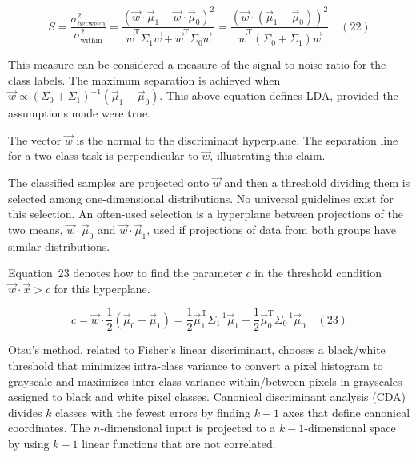 \documentclass[preprint,12pt]{elsarticle}
\begin{document}
\begin{equation}
	S={\frac{\sigma_{\text{between}}^{2}}{\sigma_{\text{within}}^{2}}}={\frac{({\vec{w}}\cdot{\vec{\mu}}_{1}-{\vec{w}}\cdot {\vec{\mu}}_{0})^{2}}{{\vec{w}}^{\mathrm{T}}\Sigma_{1}{\vec{w}}+{\vec{w}}^{\mathrm{T}}\Sigma_{0}{\vec{w}}}}={\frac{({\vec{w}}\cdot ({\vec{\mu}}_{1}-{\vec{\mu}}_{0}))^{2}}{{\vec{w}}^{\mathrm{T}}(\Sigma_{0}+\Sigma_{1}){\vec{w}}}}
	\quad\left(22\right)
\end{equation}

This measure can be considered a measure of the signal-to-noise ratio for the class labels. The maximum separation is achieved when ${\vec{w}}\propto\left(\Sigma_{0}+\Sigma_{1}\right)^{-1}\left({\vec{\mu}}_{1}-{\vec{\mu}}_{0}\right)$. This above equation defines LDA, provided the assumptions made were true.

The vector  $\vec{w}$ is the normal to the discriminant hyperplane. The separation line for a two-class task is perpendicular to $\vec{w}$, illustrating this claim.

The classified samples are projected onto $\vec{w}$ and then a threshold dividing them is selected among one-dimensional distributions. No universal guidelines exist for this selection. An often-used selection is a hyperplane between projections of the two means, ${\vec{w}}\cdot {\vec{\mu}}_{0}$ and $ \vec{w} \cdot {\vec{\mu}}_{1}$, used if projections of data from both groups have similar distributions. 

Equation~23 denotes how to find the parameter $c$ in the threshold condition ${\vec{w}}\cdot {\vec{x}} > c$ for this hyperplane.

\begin{equation}
	c={\vec{w}}\cdot {\frac{1}{2}}({\vec{\mu}}_{0}+{\vec{\mu}}_{1})={\frac{1}{2}}{\vec{\mu}}_{1}^{\mathrm{T}}\Sigma_{1}^{-1}{\vec{\mu}}_{1}-{\frac{1}{2}}{\vec{\mu}}_{0}^{\mathrm{T}}\Sigma_{0}^{-1}{\vec{\mu}}_{0}
	\quad\left(23\right)
\end{equation}

Otsu's method, related to Fisher's linear discriminant, chooses a black/white threshold that minimizes intra-class variance to convert a pixel histogram to grayscale and maximizes inter-class variance within/between pixels in grayscales assigned to black and white pixel classes. Canonical discriminant analysis (CDA) divides $k$ classes with the fewest errors by finding $k - 1$ axes that define canonical coordinates. The $n$-dimensional input is projected to a $k - 1$-dimensional space by using $k - 1$ linear functions that are not correlated.
\end{document}
